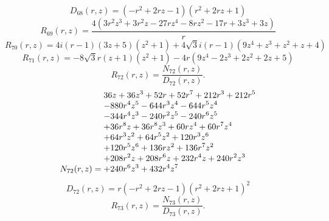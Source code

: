 \documentclass[11pt,a4paper]{article}
\begin{document}
\begin{equation}
D_{68}(r,z)=\left(- r^{2} + 2 r z - 1\right) \left(r^{2} + 2 r z + 1\right)
\label{eq:cat-denominator-68}
\end{equation}
\begin{equation}
R_{69}(r,z)=\frac{4 \left(3 r^{2} z^{3} + 3 r^{2} z - 27 r z^{4} - 8 r z^{2} - 17 r + 3 z^{3} + 3 z\right)}{r}
\label{eq:cat-rational-69}
\end{equation}
\begin{equation}
R_{70}(r,z)=4 i \left(r - 1\right) \left(3 z + 5\right) \left(z^{2} + 1\right) + 4 \sqrt{3} i \left(r - 1\right) \left(9 z^{4} + z^{3} + z^{2} + z + 4\right)
\label{eq:cat-rational-70}
\end{equation}
\begin{equation}
R_{71}(r,z)=- 8 \sqrt{3} r \left(z + 1\right) \left(z^{2} + 1\right) - 4 r \left(9 z^{4} - 2 z^{3} + 2 z^{2} + 2 z + 5\right)
\label{eq:cat-rational-71}
\end{equation}
\begin{equation}
R_{72}(r,z)=\frac{N_{72}(r,z)}{D_{72}(r,z)}.
\label{eq:cat-rational-72}
\end{equation}
\begin{equation}
N_{72}(r,z)=\shortstack[l]{$\displaystyle 36 z + 36 z^{3} + 52 r + 52 r^{7} + 212 r^{3} + 212 r^{5}$\\
$\displaystyle  - 880 r^{4} z^{5} - 644 r^{3} z^{4} - 644 r^{5} z^{4}$\\
$\displaystyle  - 344 r^{4} z^{3} - 240 r^{2} z^{5} - 240 r^{6} z^{5}$\\
$\displaystyle  + 36 r^{8} z + 36 r^{8} z^{3} + 60 r z^{4} + 60 r^{7} z^{4}$\\
$\displaystyle  + 64 r^{3} z^{2} + 64 r^{5} z^{2} + 120 r^{3} z^{6}$\\
$\displaystyle  + 120 r^{5} z^{6} + 136 r z^{2} + 136 r^{7} z^{2}$\\
$\displaystyle  + 208 r^{2} z + 208 r^{6} z + 232 r^{4} z + 240 r^{2} z^{3}$\\
$\displaystyle  + 240 r^{6} z^{3} + 432 r^{4} z^{7}$}
\label{eq:cat-numerator-72}
\end{equation}
\begin{equation}
D_{72}(r,z)=r \left(- r^{2} + 2 r z - 1\right) \left(r^{2} + 2 r z + 1\right)^{2}
\label{eq:cat-denominator-72}
\end{equation}
\begin{equation}
R_{73}(r,z)=\frac{N_{73}(r,z)}{D_{73}(r,z)}.
\label{eq:cat-rational-73}
\end{equation}
\end{document}
